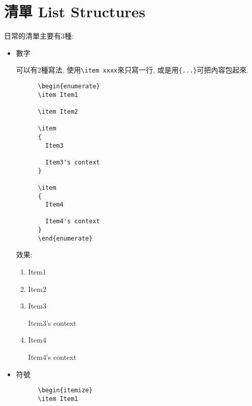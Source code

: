 \newpage
\section{清單 List Structures}

  日常的清單主要有3種:

\begin{itemize}
  \item
  {
    數字

    可以有2種寫法, 使用\verb|\item xxxx|來只寫一行, 或是用\verb|{...}|可把內容包起來.
    \begin{framed}
    \begin{verbatim}
      \begin{enumerate}
      \item Item1

      \item Item2

      \item
      {
        Item3

        Item3's context
      }

      \item
      {
        Item4

        Item4's context
      }
      \end{enumerate}
    \end{verbatim}
    \end{framed}

    效果:
    \begin{enumerate}
      \item Item1

      \item Item2

      \item
      {
        Item3

        Item3's context
      }

      \item
      {
        Item4

        Item4's context
      }
    \end{enumerate}
  } %

  \newpage
  \item
  {
    符號

    \begin{framed}
    \begin{verbatim}
      \begin{itemize}
      \item Item1


\end{verbatim}
\end{framed}}
\end{itemize}
